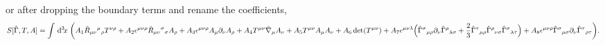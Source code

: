 \documentclass[twocolumn,
  showpacs,showkeys,prd,superscriptaddress]{revtex4-1}
\def\md{{\mathrm{d}}}
\def\l{\left}
\def\r{\right}
\begin{document}
or after dropping the boundary terms and rename the coefficients,
\begin{dmath}[compact, spread=2pt]
  \label{3Dfull}
  S[\hat\Gamma,T,A] =
  \int \dn{3}{x} \bigg( 
  A_1\hat R_{\mu\nu}{}^{\mu}{}_\rho T^{\nu\rho} 
  +A_2\epsilon^{\mu\nu\rho}\hat R_{\mu\nu}{}^{\sigma}{}_\sigma A_\rho
  +A_3\epsilon^{\mu\nu\rho}A_\mu\partial_\nu A_\rho
  +A_4T^{\mu\nu}\hat\nabla_\mu A_\nu
  +A_5T^{\mu\nu}A_\mu A_\nu
  +A_6\det(T^{\mu\nu}) 
  +A_7\epsilon^{\mu\nu\lambda}\Big(\hat\Gamma^{\sigma}{}_{\mu\rho}\partial_\nu\hat\Gamma^{\rho}{}_{\lambda\sigma}
  +\frac{2}{3}\hat\Gamma^{\tau}{}_{\mu\rho}\hat\Gamma^{\rho}{}_{\nu\sigma}{}\hat\Gamma^{\sigma}{}_{\lambda\tau}{}\Big)
  + A_8\epsilon^{\mu\nu\rho}\hat\Gamma^{\sigma}{}_{\mu\sigma}\partial_\nu\hat\Gamma^{\tau}{}_{\rho\tau}
  \bigg).
\end{dmath}
\end{document}
